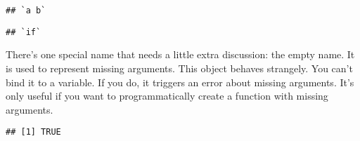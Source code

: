 \begin{Shaded}
\begin{Highlighting}[]
\NormalTok{(}\NormalTok{)}
\end{Highlighting}
\end{Shaded}

\begin{verbatim}
## `a b`
\end{verbatim}

\begin{Shaded}
\begin{Highlighting}[]
\NormalTok{(}\NormalTok{)}
\end{Highlighting}
\end{Shaded}

\begin{verbatim}
## `if`
\end{verbatim}

There's one special name that needs a little extra discussion: the empty
name. It is used to represent missing arguments. This object behaves
strangely. You can't bind it to a variable. If you do, it triggers an
error about missing arguments. It's only useful if you want to
programmatically create a function with missing arguments.

\begin{Shaded}
\begin{Highlighting}[]
\StringTok{ }
\OperatorTok{$}
\end{Highlighting}
\end{Shaded}

\begin{Shaded}
\begin{Highlighting}[]
\NormalTok{(}\OperatorTok{$}
\end{Highlighting}
\end{Shaded}

\begin{verbatim}
## [1] TRUE
\end{verbatim}

\begin{Shaded}
\begin{Highlighting}[]
\NormalTok{(}\OperatorTok{$}
\end{Highlighting}
\end{Shaded}

